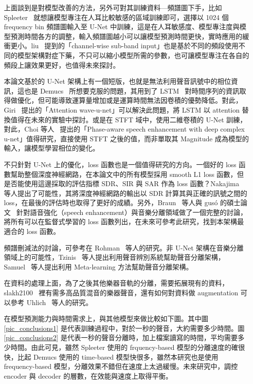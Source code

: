 上面談到是對模型改善的方法，另外可對其訓練資料—頻譜圖下手，比如 Spleeter~\cite{hennequin2020spleeter} 就想讓模型專注在人耳比較敏感的區域訓練即可，選擇以 1024 個 frequency bin 頻譜圖輸入至 U-Net 中訓練，這是在人耳敏感度、模型專注度與模型預測時間各方的調整，輸入頻譜圖越小可以讓模型預測時間更快，實時應用的緩衝更小。liu~\cite{liu2020channel} 提到的「channel-wise sub-band input」也是基於不同的頻段使用不同的模型架構對症下藥，不只可以縮小模型所需的參數，也可讓模型專注在各自的頻段上讓效果更好，也值得未來探討。

本論文基於的 U-Net 架構上有一個短版，也就是無法利用聲音訊號中的相位資訊，這也是 Demucs~\cite{defossez2019music} 所想要克服的問題，其用到了 LSTM~\cite{gers1999learning} 對時間序列的資訊取得做優化，但可能導致運算量增加或是運算時間無法因卷積的優勢降低。對此，Giri~\cite{giri2019attention} 提出的「Attention wave-u-net」可以解決此問題，將 LSTM 以 attention 替換值得在未來的實驗中探討。或是在 STFT 域中，使用二維卷積的 U-Net 訓練，對此，Choi 等人~\cite{choi2018phase} 提出的「Phase-aware speech enhancement with deep complex u-net」值得研究，直接使用 STFT 之後的值，而非單取其 Magnitude 成為模型的輸入，讓模型學習相位的變化。

不只針對 U-Net 上的優化，loss 函數也是一個值得研究的方向。一個好的 loss 函數幫助整個深度神經網路，在本論文中的所有模型採用 smooth L1 loss 函數，但是否能使用這邊採取的評估指標 SDR、SIR 與 SAR 作為 loss 函數？Nakajima~\cite{nakajima2018monaural} 等人提出了可能性，其將深度神經網路的輸出以 SDR 計算其與正確的訊號之間的 loss，在最後的評估時也取得了更好的成績。另外，Braun~\cite{braun2020consolidated} 等人與 gusó 的碩士論文~\cite{guso2020on_loss_functions} 針對語音強化（speech enhancement）與音樂分離領域做了一個完整的討論，將所有可以在監督式學習的 loss 函數列出，在未來可參考此研究，找到本架構最適合的 loss 函數。

頻譜刪減法的討論，可參考在 Rohman~\cite{rohman2016novel} 等人的研究。非 U-Net 架構在音樂分離領域上的可能性，Tzinis~\cite{tzinis2020improving} 等人提出利用聲音辨別系統幫助聲音分離架構，Samuel~\cite{samuel2020meta} 等人提出利用 Meta-learning 方法幫助聲音分離架構。

在資料的處理上面，為了之後其他樂器音軌的分離，需要拓展現有的資料，slakh2100~\cite{manilow2019cutting} 裡有需多高品質混音的樂器聲音，還有如何對資料做 augmentation 可以參考 Uhlich~\cite{uhlich2017improving} 等人的研究。

在模型預測能力與時間需求上，與其他模型來做比較如下圖。其中圖\ref{pic_conclusions1} 是代表訓練過程中，對於一秒的聲音，大約需要多少時間。圖\ref{pic_conclusions2} 是代表一秒的聲音分離時，加上檔案讀寫的時間，平均需要多少時間。由此可見，雖然 Spleeter 使用的 frquency-based 模型的分離速度的確很快，比起 Demucs 使用的 time-based 模型快很多，雖然本研究也是使用 frequency-based 模型，分離效果不錯但在速度上太過緩慢。未來研究中，調控 encoder 與 decoder 的層數，在效能與速度上取得平衡。

